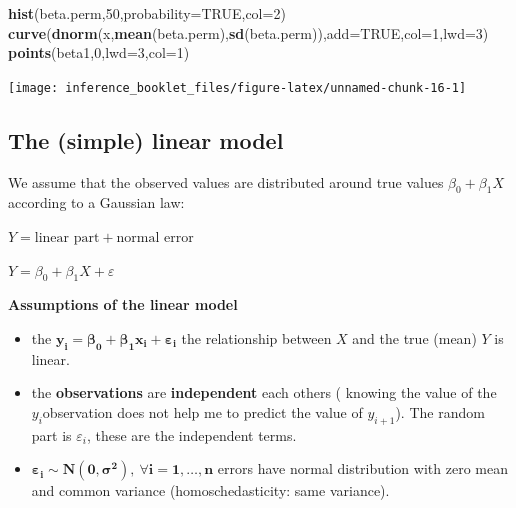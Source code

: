 \documentclass[]{article}
\newenvironment{Shaded}{\begin{snugshade}}{\end{snugshade}}
\newcommand{\KeywordTok}[1]{\textcolor[rgb]{0.13,0.29,0.53}{\textbf{#1}}}
\newcommand{\DataTypeTok}[1]{\textcolor[rgb]{0.13,0.29,0.53}{#1}}
\newcommand{\DecValTok}[1]{\textcolor[rgb]{0.00,0.00,0.81}{#1}}
\newcommand{\OtherTok}[1]{\textcolor[rgb]{0.56,0.35,0.01}{#1}}
\newcommand{\NormalTok}[1]{#1}
\providecommand{\tightlist}{%
  \setlength{\itemsep}{0pt}\setlength{\parskip}{0pt}}
\begin{document}
\begin{Shaded}
\begin{Highlighting}[]
\KeywordTok{hist}\NormalTok{(beta.perm,}\DecValTok{50}\NormalTok{,}\DataTypeTok{probability=}\OtherTok{TRUE}\NormalTok{,}\DataTypeTok{col=}\DecValTok{2}\NormalTok{)}
\KeywordTok{curve}\NormalTok{(}\KeywordTok{dnorm}\NormalTok{(x,}\KeywordTok{mean}\NormalTok{(beta.perm),}\KeywordTok{sd}\NormalTok{(beta.perm)),}\DataTypeTok{add=}\OtherTok{TRUE}\NormalTok{,}\DataTypeTok{col=}\DecValTok{1}\NormalTok{,}\DataTypeTok{lwd=}\DecValTok{3}\NormalTok{)}
\KeywordTok{points}\NormalTok{(beta1,}\DecValTok{0}\NormalTok{,}\DataTypeTok{lwd=}\DecValTok{3}\NormalTok{,}\DataTypeTok{col=}\DecValTok{1}\NormalTok{)}
\end{Highlighting}
\end{Shaded}

\begin{center}\texttt{[image: inference\_booklet\_files/figure-latex/unnamed-chunk-16-1]} \end{center}

\subsection{The (simple) linear model}\label{the-simple-linear-model}

We assume that the observed values are distributed around true values
\(\beta_0 + \beta_1 X\) according to a Gaussian law:

\(Y=\textrm{linear part} + \textrm{normal error}\)

\(Y=\beta_0 + \beta_1 X + \varepsilon\)

\textbf{Assumptions of the linear model }

\begin{itemize}
\tightlist
\item
  the \(\boldsymbol{y_i=\beta_0 + \beta_1 x_i + \varepsilon_i}\) the
  relationship between \(X\) and the true (mean) \(Y\) is linear.
\item
  the \textbf{observations } are \textbf{independent} each others (
  knowing the value of the \(y_i\)observation does not help me to
  predict the value of \(y_{i + 1}\)). The random part is
  \(\varepsilon_i\), these are the independent terms.
\item
  \(\boldsymbol{\varepsilon_i \sim N (0, \sigma ^ 2), \ \forall i=1, \ldots, n}\)
  errors have normal distribution with zero mean and common variance
  (homoschedasticity: same variance).
\end{itemize}
\end{document}
